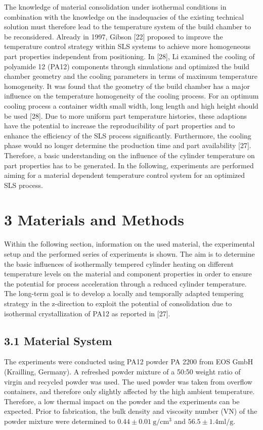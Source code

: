 \documentclass[10pt]{article}
\begin{document}
The knowledge of material consolidation under isothermal conditions in combination with the knowledge on the inadequacies of the existing technical solution must therefore lead to the temperature system of the build chamber to be reconsidered. Already in 1997, Gibson [22] proposed to improve the temperature control strategy within SLS systems to achieve more homogeneous part properties independent from positioning. In [28], Li examined the cooling of polyamide 12 (PA12) components through simulations and optimized the build chamber geometry and the cooling parameters in terms of maximum temperature homogeneity. It was found that the geometry of the build chamber has a major influence on the temperature homogeneity of the cooling process. For an optimum\\
cooling process a container width small width, long length and high height should be used [28]. Due to more uniform part temperature histories, these adaptions have the potential to increase the reproducibility of part properties and to enhance the efficiency of the SLS process significantly. Furthermore, the cooling phase would no longer determine the production time and part availability [27]. Therefore, a basic understanding on the influence of the cylinder temperature on part properties has to be generated. In the following, experiments are performed aiming for a material dependent temperature control system for an optimized SLS process.

\section*{3 Materials and Methods}
Within the following section, information on the used material, the experimental setup and the performed series of experiments is shown. The aim is to determine the basic influences of isothermally tempered cylinder heating on different temperature levels on the material and component properties in order to ensure the potential for process acceleration through a reduced cylinder temperature. The long-term goal is to develop a locally and temporally adapted tempering strategy in the z-direction to exploit the potential of consolidation due to isothermal crystallization of PA12 as reported in [27].

\subsection*{3.1 Material System}
The experiments were conducted using PA12 powder PA 2200 from EOS GmbH (Krailling, Germany). A refreshed powder mixture of a 50:50 weight ratio of virgin and recycled powder was used. The used powder was taken from overflow containers, and therefore only slightly affected by the high ambient temperature. Therefore, a low thermal impact on the powder and the experiments can be expected. Prior to fabrication, the bulk density and viscosity number (VN) of the powder mixture were determined to $0.44 \pm 0.01 \mathrm{~g} / \mathrm{cm}^{3}$ and $56.5 \pm 1.4 \mathrm{ml} / \mathrm{g}$.
\end{document}
